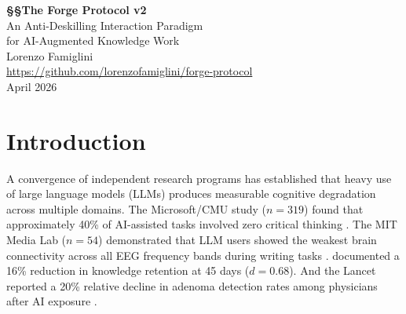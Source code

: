 \documentclass[11pt,a4paper]{article}
\begin{document}
\begin{center}
    {\LARGE\bfseries §§The Forge Protocol v2}\\[0.4cm]
    {\large An Anti-Deskilling Interaction Paradigm\\for AI-Augmented Knowledge Work}\\[0.8cm]
    {\normalsize Lorenzo Famiglini}\\[0.2cm]
    {\small \url{https://github.com/lorenzofamiglini/forge-protocol}}\\[0.6cm]
    {\small April 2026}
\end{center}

\begin{abstract}
A convergence of empirical research from 2024--2026 confirms that heavy LLM use
degrades critical thinking, weakens neural connectivity during writing, reduces
knowledge retention, and causes measurable clinical deskilling. The failure mode
is well-characterised: users dump fragments into an LLM, accept completions, and
outsource cognitive work---a textbook instance of the generation effect in
reverse. This paper presents the Forge Protocol, a structured interaction
framework grounded in cognitive science that defines four modes of LLM
interaction (Forge, Anvil, Crucible, Executor), each with explicit rules about
what the LLM does, what the user does, and when each mode applies. The protocol
is designed to reverse AI-induced deskilling by exploiting the same cognitive
mechanisms---generation effects, desirable difficulties, cognitive forcing
strategies---that the standard LLM interaction pattern destroys. Design
principles draw extensively on Cabitza et al.'s empirical program on human--AI
collaboration protocols, frictional AI, and technology dominance measurement.
\end{abstract}

\tableofcontents
\newpage

\section{Introduction}
\label{sec:introduction}

A convergence of independent research programs has established that heavy use of
large language models (LLMs) produces measurable cognitive degradation across
multiple domains. The Microsoft/CMU study ($n=319$) found that approximately 40\%
of AI-assisted tasks involved zero critical thinking
\citep{lee2025critical}. The MIT Media Lab ($n=54$) demonstrated that LLM users
showed the weakest brain connectivity across all EEG frequency bands during
writing tasks \citep{kosmyna2025brain}. \citet{barcaui2025retention} documented a
16\% reduction in knowledge retention at 45 days ($d=0.68$). And the Lancet
reported a 20\% relative decline in adenoma detection rates among physicians after
AI exposure \citep{lancet2025deskilling}.
\end{document}
